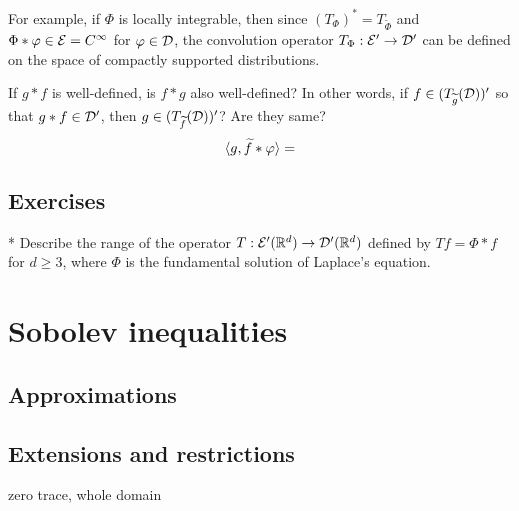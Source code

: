 \documentclass{../../large}
\begin{document}
For example, if $\Phi$ is locally integrable, then since $(T_\Phi)^*=T_{\tilde\Phi}$ and $\Phi*\varphi\in\mathcal{E}=C^\infty$ for $\varphi\in\mathcal{D}$, the convolution operator $T_\Phi:\mathcal{E}'\to\mathcal{D}'$ can be defined on the space of compactly supported distributions.

If $g*f$ is well-defined, is $f*g$ also well-defined?
In other words, if $f\in(T_{\widetilde g}(\mathcal{D}))'$ so that $g*f\in\mathcal{D}'$, then $g\in(T_{\widetilde f}(\mathcal{D}))'$? Are they same?
\[\langle g,\widetilde f*\varphi\rangle=\]



\section*{Exercises}

\begin{prb}*
Describe the range of the operator $T:\mathcal{E}'(\mathbb{R}^d)\to\mathcal{D}'(\mathbb{R}^d)$ defined by $Tf=\Phi*f$ for $d\ge3$, where $\Phi$ is the fundamental solution of Laplace's equation.
\end{prb}








\chapter{Sobolev inequalities}

\section{Approximations}
\begin{prb}
\end{prb}
\begin{prb}
\end{prb}
\begin{prb}
\end{prb}
\begin{prb}
\end{prb}

\section{Extensions and restrictions}
\begin{prb}
\end{prb}
\begin{prb}
\end{prb}
\begin{prb}
\end{prb}
\begin{prb}
zero trace, whole domain
\end{prb}
\end{document}
